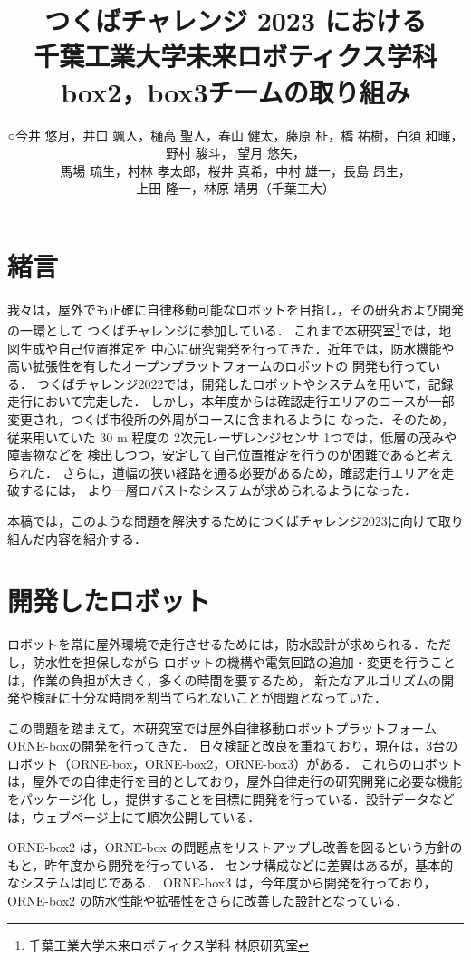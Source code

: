 \documentclass[twocolumn, 9pt]{jsproceedings}
\title{つくばチャレンジ 2023 における\\千葉工業大学未来ロボティクス学科 box2，box3チームの取り組み}
\author{○今井 悠月，井口 颯人，樋高 聖人，春山 健太，藤原 柾，\CID{8705}橋 祐樹，白須 和暉，野村 駿斗，
望月 悠矢，\\馬場 琉生，村林 孝太郎，桜井 真希，中村 雄一，長島 昂生，\\上田 隆一，林原 靖男（千葉工大）}
\affiliation{千葉工業大学未来ロボティクス学科 box2, box3チーム}
\begin{document}
\maketitle

\section{緒言}
我々は，屋外でも正確に自律移動可能なロボットを目指し，その研究および開発の一環として
つくばチャレンジに参加している．
これまで本研究室\footnote{千葉工業大学未来ロボティクス学科 林原研究室}では，地図生成や自己位置推定を
中心に研究開発を行ってきた．近年では，防水機能や高い拡張性を有したオープンプラットフォームのロボットの
開発も行っている．
つくばチャレンジ2022では，開発したロボットやシステムを用いて，記録走行において完走した．
しかし，本年度からは確認走行エリアのコースが一部変更され，つくば市役所の外周がコースに含まれるように
なった．そのため，従来用いていた 30 m 程度の 2次元レーザレンジセンサ 1つでは，低層の茂みや障害物などを
検出しつつ，安定して自己位置推定を行うのが困難であると考えられた．
さらに，道幅の狭い経路を通る必要があるため，確認走行エリアを走破するには，
より一層ロバストなシステムが求められるようになった．

本稿では，このような問題を解決するためにつくばチャレンジ2023に向けて取り組んだ内容を紹介する．

\section{開発したロボット}
ロボットを常に屋外環境で走行させるためには，防水設計が求められる．ただし，防水性を担保しながら
ロボットの機構や電気回路の追加・変更を行うことは，作業の負担が大きく，多くの時間を要するため，
新たなアルゴリズムの開発や検証に十分な時間を割当てられないことが問題となっていた．

この問題を踏まえて，本研究室では屋外自律移動ロボットプラットフォーム ORNE-boxの開発を行ってきた\cite{box}．
日々検証と改良を重ねており，現在は，3台のロボット（ORNE-box，ORNE-box2，ORNE-box3）がある．
これらのロボットは，屋外での自律走行を目的としており，屋外自律走行の研究開発に必要な機能をパッケージ化
し，提供することを目標に開発を行っている．設計データなどは，ウェブページ上にて順次公開している\cite{box-data}．

ORNE-box2 は，ORNE-box の問題点をリストアップし改善を図るという方針のもと，昨年度から開発を行っている．
センサ構成などに差異はあるが，基本的なシステムは同じである．
ORNE-box3 は，今年度から開発を行っており，ORNE-box2 の防水性能や拡張性をさらに改善した設計となっている．
\end{document}

